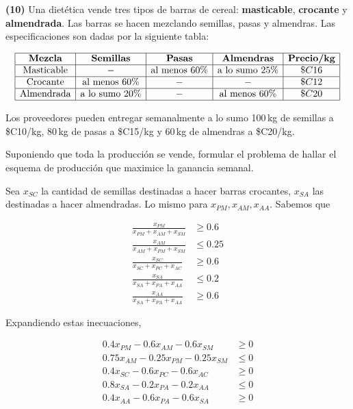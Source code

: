 \documentclass[12pt]{article}
\begin{document}
\begin{myframe}
    
\textbf{(10)} Una dietética vende tres tipos de barras de cereal:
\textbf{masticable}, \textbf{crocante} y \textbf{almendrada}. Las barras se
hacen mezclando semillas, pasas y almendras. Las especificaciones son dadas por
la siguiente tabla:

\[
\begin{array}{|c|c|c|c|c|}
\hline
\textbf{Mezcla} & \textbf{Semillas} & \textbf{Pasas} &
\textbf{Almendras} & \textbf{Precio/kg} \\
\hline
\text{Masticable} & - & \text{al menos }60\% &
\text{a lo sumo }25\% & \$C16 \\
\hline
\text{Crocante} & \text{al menos }60\% & - &
- & \$C12 \\
\hline
\text{Almendrada} & \text{a lo sumo }20\% & - &
\text{al menos }60\% & \$C20 \\
\hline
\end{array}
\]

Los proveedores pueden entregar semanalmente a lo sumo
100\,kg de semillas a \$C10/kg,
80\,kg de pasas a \$C15/kg
y 60\,kg de almendras a \$C20/kg.

Suponiendo que toda la producción se vende,
formular el problema de hallar el esquema de producción
que maximice la ganancia semanal.
\end{myframe}

Sea $x_{SC}$ la cantidad de semillas destinadas a hacer barras crocantes,
$x_{SA}$ las destinadas a hacer almendradas. Lo mismo para $x_{PM}, x_{AM},
x_{AA}$. Sabemos que 

\begin{align*}
    \frac{ x_{PM} }{x_{PM} + x_{AM} + x_{SM}} &\geq 0.6 \\ 
    \frac{x_{AM}}{x_{AM} + x_{PM} + x_{SM}} &\leq 0.25\\ 
    \frac{ x_{SC} }{x_{SC} + x_{PC} + x_{AC}} &\geq 0.6\\ 
    \frac{x_{SA}}{x_{SA} + x_{PA} + x_{A A}} &\leq 0.2\\
    \frac{x_{AA}}{x_{SA} + x_{PA} + x_{A A}} &\geq 0.6
\end{align*}

Expandiendo estas inecuaciones, 

\begin{align*}
    0.4 x_{PM} - 0.6x_{AM} - 0.6x_{SM} &\geq 0 \\ 
    0.75x_{AM} - 0.25x_{PM} - 0.25x_{SM} &\leq 0 \\ 
    0.4x_{SC} - 0.6x_{PC} - 0.6x_{AC} &\geq 0 \\ 
    0.8 x_{SA} - 0.2 x_{PA} - 0.2 x_{A A} &\leq 0\\ 
    0.4 x_{A A} - 0.6x_{PA} - 0.6 x_{S A} &\geq 0
\end{align*}
\end{document}

